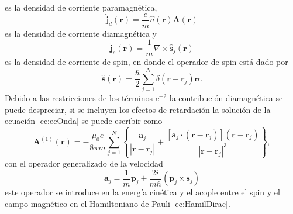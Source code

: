 es la densidad de corriente paramagn\'etica,
\begin{equation}
	\hat{\pmb{j}}_d (\pmb{r}) = \frac{e}{m} \hat{n} (\pmb{r}) \pmb{A} (\pmb{r}) \label{ec:Jdia}
\end{equation}
es la densidad de corriente diamagn\'etica y 
\begin{equation}
	\hat{\pmb{j}}_s  (\pmb{r}) = \frac{1}{m} \nabla \times \hat{\pmb{s}}_j (\pmb{r}) \label{ec;Jspin}
\end{equation}
es la densidad de corriente de spin, en donde el operador de spin est\'a dado por
\begin{equation}
	\hat{\pmb{s}} (\pmb{r}) =\frac{\hbar}{2} \sum_{j=1}^{N} \delta (\pmb{r}- \pmb{r}_j) \pmb{\sigma}. \label{ec:SpinOp}
\end{equation}
Debido a las restricciones de los t\'erminos $c^{-2}$ la contribuci\'on diamagn\'etica se puede despreciar, si se incluyen los efectos de retardaci\'on la soluci\'on de la ecuaci\'on \ref{ec:ecOnda} se puede escribir como \cite{flugge_quantum_1957}
\begin{equation}
	\pmb{A}^{(1)} (\pmb{r}) = - \frac{\mu_0 e}{8 \pi m} \sum_{j=1}^{N} \left\{\frac{\pmb{a}_j}{|\pmb{r}-\pmb{r}_j|} + \frac{[\pmb{a}_j \cdot (\pmb{r}-\pmb{r}_j)] (\pmb{r}- \pmb{r}_j)}{|\pmb{r}-\pmb{r}_j|^3} \right\}, \label{ec:SolecOnda}
\end{equation}
con el operador generalizado de la velocidad
\begin{equation}
	\pmb{a}_j = \frac{1}{m} \pmb{p}_j + \frac{2 i }{m \hbar} (\pmb{p}_j \times \pmb{s}_j) \label{ec:genVelocity}
\end{equation}
este operador se introduce en la energ\'ia cin\'etica y el acople entre el spin y el campo magn\'etico en el Hamiltoniano de Pauli \ref{ec:HamilDirac}. 

